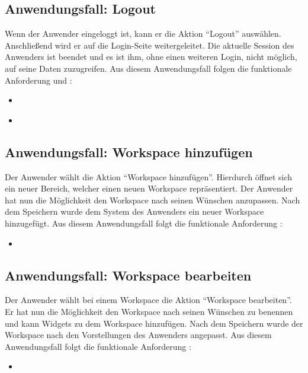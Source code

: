 \subsection{Anwendungsfall: Logout}
Wenn der Anwender eingeloggt ist, kann er die Aktion "`Logout"' auswählen. Anschließend wird er auf die Login-Seite weitergeleitet. Die aktuelle Session des Anwenders ist beendet und es ist ihm, ohne einen weiteren Login, nicht möglich, auf seine Daten zuzugreifen. Aus diesem Anwendungsfall folgen die funktionale Anforderung  und :
\begin{itemize}
 \item \requirementf{\requirementLogout}\label{requirementLogout}
 \item \requirementf{\requirementKeinZugriffNachLogout}\label{requirementKeinZugriffNachLogout}
\end{itemize}

\subsection{Anwendungsfall: Workspace hinzufügen}
Der Anwender wählt die Aktion "`Workspace hinzufügen"'. Hierdurch öffnet sich ein neuer Bereich, welcher einen neuen Workspace repräsentiert. Der Anwender hat nun die Möglichkeit den Workspace nach seinen Wünschen anzupassen. Nach dem Speichern wurde dem System des Anwenders ein neuer Workspace hinzugefügt. Aus diesem Anwendungsfall folgt die funktionale Anforderung :
\begin{itemize}
 \item \requirementf{\requirementWorkspaceAdd}\label{requirementWorkspaceAdd}
\end{itemize}
 
\subsection{Anwendungsfall: Workspace bearbeiten}
Der Anwender wählt bei einem Workspace die Aktion "`Workspace bearbeiten"'. Er hat nun die Möglichkeit den Workspace nach seinen Wünschen zu benennen und kann Widgets zu dem Workspace hinzufügen. Nach dem Speichern wurde der Workspace nach den Vorstellungen des Anwenders angepasst. Aus diesem Anwendungsfall folgt die funktionale Anforderung :
\begin{itemize}
 \item \requirementf{\requirementWorkspaceEdit}\label{requirementWorkspaceEdit}
\end{itemize}
 
